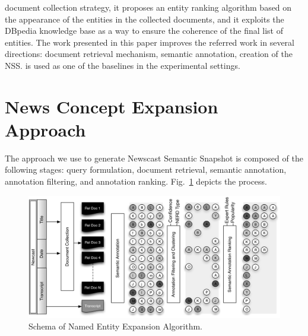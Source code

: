 \documentclass{llncs}
\newcommand{\hg}[1]{\colorbox{yellow}{#1}}
\begin{document}
document collection strategy, it proposes an entity ranking algorithm based on the appearance of the entities in the collected documents, and it exploits the DBpedia knowledge base as a way to ensure the coherence of the final list of entities. The work presented in this paper improves the referred work in several directions: document retrieval mechanism, semantic annotation, creation of the NSS. \cite{RedondoGarcia2014} is used as one of the baselines in the experimental settings.%

\section{News Concept Expansion Approach}
\label{sec:Approach}
The approach we use to generate Newscast Semantic Snapshot is composed of the following stages: query formulation, document retrieval, semantic annotation, annotation filtering, and annotation ranking. Fig.~\ref{fig:namedEntityExpansion} depicts the process.
\begin{figure}[h!]
\centering
\includegraphics[width=1\textwidth]{figure/ExpansionDiagram}
\caption{Schema of Named Entity Expansion Algorithm.}
\label{fig:namedEntityExpansion}%
\end{figure}
\end{document}
